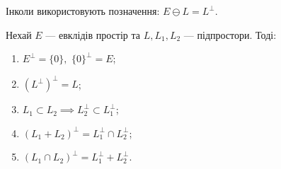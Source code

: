\documentclass{math_library}
\begin{document}
\begin{remark}
Інколи використовують позначення: $E \ominus L = L^{\perp}$.
\end{remark}

\begin{proposition}
Нехай $E$ --- евклідів простір та $L,L_1,L_2$ --- підпростори. Тоді:
\begin{enumerate}[nosep, wide=0pt, label={\arabic*)}]
\item $E^{\perp} = \{0\},$ \qquad $\{0\}^{\perp} = E$;
\item $(L^{\perp})^{\perp} = L$;
\item $L_1 \subset L_2 \implies L_2^{\perp} \subset L_1^{\perp}$;
\item $(L_1+L_2)^{\perp} = L_1^{\perp} \cap L_2^{\perp}$;
\item $(L_1 \cap L_2)^{\perp} = L_1^{\perp} + L_2^{\perp}$.
\end{enumerate}
\end{proposition}
\end{document}
